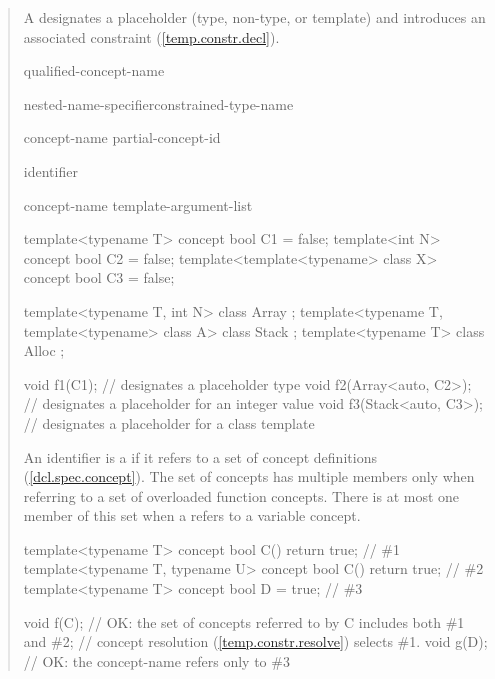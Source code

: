 \begin{quote}
\pnum
A  designates a placeholder
(type, non-type, or template) and introduces an associated constraint
(\ref{temp.constr.decl}).

\begin{bnf}
\br
	qualified-concept-name

\br
	nested-name-specifier\opt constrained-type-name

\br
  concept-name\br
  partial-concept-id

\br
  identifier

\br
		concept-name \terminal{<} template-argument-list\opt \terminal{>}
\end{bnf}

\enterexample
\begin{codeblock}
template<typename T> concept bool C1 = false;
template<int N> concept bool C2 = false;
template<template<typename> class X> concept bool C3 = false;

template<typename T, int N> class Array { };
template<typename T, template<typename> class A> class Stack { };
template<typename T> class Alloc { };

void f1(C1);              //  designates a placeholder type
void f2(Array<auto, C2>); //  designates a placeholder for an integer value
void f3(Stack<auto, C3>); //  designates a placeholder for a class template
\end{codeblock}
\exitexample

\pnum
An identifier is a  if it refers to a set of 
concept definitions (\ref{dcl.spec.concept}).
%
\enternote
The set of concepts has multiple members only when referring to a set of 
overloaded function concepts. There is at most one member of this set when a
 refers to a variable concept.
\exitnote
%
\enterexample
\begin{codeblock}
template<typename T> concept bool C() { return true; }             // \#1
template<typename T, typename U> concept bool C() { return true; } // \#2
template<typename T> concept bool D = true;                        // \#3

void f(C); // OK: the set of concepts referred to by C includes both \#1 and \#2;
           // concept resolution (\ref{temp.constr.resolve}) selects \#1.
void g(D); // OK: the concept-name  refers only to \#3
\end{codeblock}
\exitexample


\end{quote}

